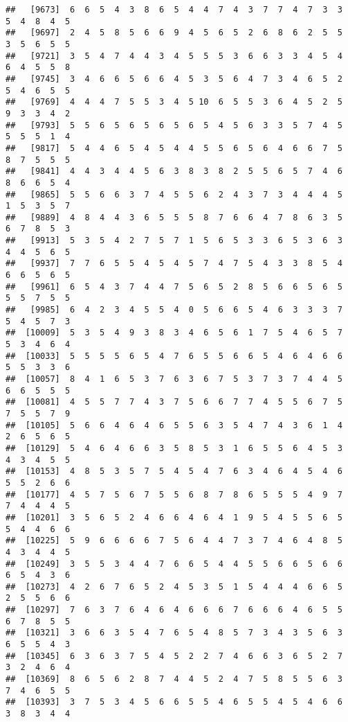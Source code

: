 \documentclass[
]{book}
\begin{document}
\begin{verbatim}
##   [9673]  6  6  5  4  3  8  6  5  4  4  7  4  3  7  7  4  7  3  3  5  4  8  4  5
##   [9697]  2  4  5  8  5  6  6  9  4  5  6  5  2  6  8  6  2  5  5  3  5  6  5  5
##   [9721]  3  5  4  7  4  4  3  4  5  5  5  3  6  6  3  3  4  5  4  6  4  5  5  8
##   [9745]  3  4  6  6  5  6  6  4  5  3  5  6  4  7  3  4  6  5  2  5  4  6  5  5
##   [9769]  4  4  4  7  5  5  3  4  5 10  6  5  5  3  6  4  5  2  5  9  3  3  4  2
##   [9793]  5  5  6  5  6  5  6  5  6  5  4  5  6  3  3  5  7  4  5  5  5  5  1  4
##   [9817]  5  4  4  6  5  4  5  4  4  5  5  6  5  6  4  6  6  7  5  8  7  5  5  5
##   [9841]  4  4  3  4  4  5  6  3  8  3  8  2  5  5  6  5  7  4  6  8  6  6  5  4
##   [9865]  5  5  6  6  3  7  4  5  5  6  2  4  3  7  3  4  4  4  5  1  5  3  5  7
##   [9889]  4  8  4  4  3  6  5  5  5  8  7  6  6  4  7  8  6  3  5  6  7  8  5  3
##   [9913]  5  3  5  4  2  7  5  7  1  5  6  5  3  3  6  5  3  6  3  4  4  5  6  5
##   [9937]  7  7  6  5  5  4  5  4  5  7  4  7  5  4  3  3  8  5  4  6  6  5  6  5
##   [9961]  6  5  4  3  7  4  4  7  5  6  5  2  8  5  6  6  5  6  5  5  5  7  5  5
##   [9985]  6  4  2  3  4  5  5  4  0  5  6  6  5  4  6  3  3  3  7  5  4  5  7  3
##  [10009]  5  3  5  4  9  3  8  3  4  6  5  6  1  7  5  4  6  5  7  5  3  4  6  4
##  [10033]  5  5  5  5  6  5  4  7  6  5  5  6  6  5  4  6  4  6  6  5  5  3  3  6
##  [10057]  8  4  1  6  5  3  7  6  3  6  7  5  3  7  3  7  4  4  5  6  6  5  5  5
##  [10081]  4  5  5  7  7  4  3  7  5  6  6  7  7  4  5  5  6  7  5  7  5  5  7  9
##  [10105]  5  6  6  4  6  4  6  5  5  6  3  5  4  7  4  3  6  1  4  2  6  5  6  5
##  [10129]  5  4  6  4  6  6  3  5  8  5  3  1  6  5  5  6  4  5  3  4  3  4  5  5
##  [10153]  4  8  5  3  5  7  5  4  5  4  7  6  3  4  6  4  5  4  6  5  5  2  6  6
##  [10177]  4  5  7  5  6  7  5  5  6  8  7  8  6  5  5  5  4  9  7  7  4  4  4  5
##  [10201]  3  5  6  5  2  4  6  6  4  6  4  1  9  5  4  5  5  6  5  5  4  4  6  6
##  [10225]  5  9  6  6  6  6  7  5  6  4  4  7  3  7  4  6  4  8  5  4  3  4  4  5
##  [10249]  3  5  5  3  4  4  7  6  6  5  4  4  5  5  6  6  5  6  6  6  5  4  3  6
##  [10273]  4  2  6  7  6  5  2  4  5  3  5  1  5  4  4  4  6  6  5  2  5  5  6  6
##  [10297]  7  6  3  7  6  4  6  4  6  6  6  7  6  6  6  4  6  5  5  6  7  8  5  5
##  [10321]  3  6  6  3  5  4  7  6  5  4  8  5  7  3  4  3  5  6  3  6  5  5  4  3
##  [10345]  6  3  6  3  7  5  4  5  2  2  7  4  6  6  3  6  5  2  7  3  2  4  6  4
##  [10369]  8  6  5  6  2  8  7  4  4  5  2  4  7  5  8  5  5  6  3  7  4  6  5  5
##  [10393]  3  7  5  3  4  5  6  6  5  5  4  6  5  5  4  5  4  6  6  3  8  3  4  4

\end{verbatim}
\end{document}

